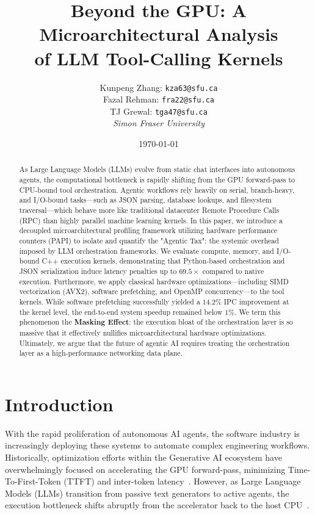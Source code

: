 \documentclass[10pt, letterpaper]{article}
\title{\textbf{Beyond the GPU: A Microarchitectural Analysis \\ \large of LLM Tool-Calling Kernels}}
\author{
    Kunpeng Zhang: \texttt{kza63@sfu.ca} \\
    Fazal Rehman: \texttt{fra22@sfu.ca} \\
    TJ Grewal: \texttt{tga47@sfu.ca} \\
    \vspace{0.5em}
    \textit{Simon Fraser University}
}
\date{\today}
\begin{document}
\maketitle

\begin{abstract}
As Large Language Models (LLMs) evolve from static chat interfaces into autonomous agents, the computational bottleneck is rapidly shifting from the GPU forward-pass to CPU-bound tool orchestration. Agentic workflows rely heavily on serial, branch-heavy, and I/O-bound tasks---such as JSON parsing, database lookups, and filesystem traversal---which behave more like traditional datacenter Remote Procedure Calls (RPC) than highly parallel machine learning kernels. In this paper, we introduce a decoupled microarchitectural profiling framework utilizing hardware performance counters (PAPI) to isolate and quantify the "Agentic Tax": the systemic overhead imposed by LLM orchestration frameworks. We evaluate compute, memory, and I/O-bound C++ execution kernels, demonstrating that Python-based orchestration and JSON serialization induce latency penalties up to $69.5\times$ compared to native execution. Furthermore, we apply classical hardware optimizations---including SIMD vectorization (AVX2), software prefetching, and OpenMP concurrency---to the tool kernels. While software prefetching successfully yielded a $14.2\%$ IPC improvement at the kernel level, the end-to-end system speedup remained below $1\%$. We term this phenomenon the \textbf{Masking Effect}: the execution bloat of the orchestration layer is so massive that it effectively nullifies microarchitectural hardware optimizations. Ultimately, we argue that the future of agentic AI requires treating the orchestration layer as a high-performance networking data plane.
\end{abstract}

\section{Introduction}
\label{sec:introduction}

With the rapid proliferation of autonomous AI agents, the software industry is increasingly deploying these systems to automate complex engineering workflows. Historically, optimization efforts within the Generative AI ecosystem have overwhelmingly focused on accelerating the GPU forward-pass, minimizing Time-To-First-Token (TTFT) and inter-token latency~\cite{data_systems, sutradhara}. However, as Large Language Models (LLMs) transition from passive text generators to active agents, the execution bottleneck shifts abruptly from the accelerator back to the host CPU~\cite{cpu_centric}. \\
\end{document}
